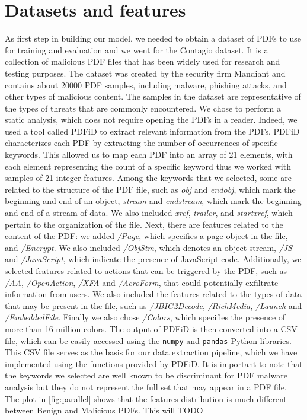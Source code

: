 \documentclass[twocolumn, switch]{article} %
\begin{document}
\section{Datasets and features}
\label{sec:datasetsandfeatures}
As first step in building our model, we needed to obtain a dataset of PDFs to use for training and evaluation and we went for the Contagio dataset. It is a collection of malicious PDF files that has been widely used for research and testing purposes. The dataset was created by the security firm Mandiant and contains about 20000 PDF samples, including malware, phishing attacks, and other types of malicious content. The samples in the dataset are representative of the types of threats that are commonly encountered.\newline
We chose to perform a static analysis, which does not require opening the PDFs in a reader. Indeed, we used a tool called PDFiD to extract relevant information from the PDFs. PDFiD characterizes each PDF by extracting the number of occurrences of specific keywords. This allowed us to map each PDF into an array of 21 elements, with each element representing the count of a specific keyword thus we worked with samples of 21 integer features.\newline
Among the keywords that we selected, some are related to the structure of the PDF file, such as \textit{obj} and \textit{endobj}, which mark the beginning and end of an object, \textit{stream} and \textit{endstream}, which mark the beginning and end of a stream of data. We also included \textit{xref}, \textit{trailer}, and \textit{startxref}, which pertain to the organization of the file. Next, there are features related to the content of the PDF: we added \textit{/Page}, which specifies a page object in the file, and \textit{/Encrypt}. We also included \textit{/ObjStm}, which denotes an object stream, \textit{/JS} and \textit{/JavaScript}, which indicate the presence of JavaScript code. Additionally, we selected features related to actions that can be triggered by the PDF, such as \textit{/AA}, \textit{/OpenAction}, \textit{/XFA} and \textit{/AcroForm}, that could potentially exfiltrate information from users. We also included the features related to the types of data that may be present in the file, such as \textit{/JBIG2Decode}, \textit{/RichMedia}, \textit{/Launch} and \textit{/EmbeddedFile}. Finally we also chose \textit{/Colors}, which specifies the presence of more than 16 million colors.\newline
The output of PDFiD is then converted into a CSV file, which can be easily accessed using the \texttt{numpy} and \texttt{pandas} Python libraries. This CSV file serves as the basis for our data extraction pipeline, which we have implemented using the functions provided by PDFiD. It is important to note that the keywords we selected are well known to be discriminant for PDF malware analysis but they do not represent the full set that may appear in a PDF file.\newline
The plot in \ref{fig:parallel} shows that the features distribution is much different between Benign and Malicious PDFs. This will TODO
\end{document}
